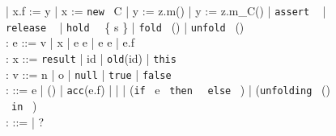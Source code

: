 \documentclass {article}
\newcommand{\code}{\texttt} %
\newcommand{\tphi}{\widetilde{\phi}}
\begin{document}
\begin{figure}[ht!]
\begin{plstx}
                           | x.f := y
                           | x := \code{new} \ C
                           | y := z.m()
                           | y := z.m_C()
                           | \code{assert} \ \phi
                           | \code{release} \ \phi
                           | \code{hold} \ \phi \ \{ s \}
                           | \code{fold} \ \alpha()
                           | \code{unfold} \ \alpha()
                           \\
  : e                 ::= v | x | e \oplus e | e \odot e | e.f \\
  : x                 ::= \code{result} | id | \code{old}(id) | \code{this} \\
  : v                 ::= n | o | \code{null} | \code{true} | \code{false} \\
  : \phi              ::= e | \alpha() | \code{acc}(e.f) | \phi \land \phi | \phi * \phi
                          | (\code{if} \ e \ \code{then} \ \phi \ \code{else} \ \phi)
                          | (\code{unfolding} \ \alpha() \ \code{in} \ \phi)
                          \\
  : \tphi             ::= \phi | ? \ast \phi \\
\end{plstx}
\end{figure}
\end{document}
